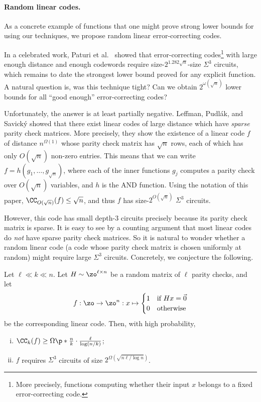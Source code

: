 \paragraph*{Random linear codes.} As a concrete example of functions that one might prove strong lower bounds for using our techniques, we propose random linear error-correcting codes.

In a celebrated work, Paturi et al.~\cite{PPSZ05} showed that error-correcting codes\footnote{More precisely, functions computing whether their input $x$ belongs to a fixed error-correcting code.} with large enough distance and enough codewords require size-$2^{1.282 \sqrt{n}}$-size $\Sigma^3$ circuits, which remains to date the strongest lower bound proved for any explicit function.
A natural question is, was this technique tight?
Can we obtain $2^{\omega(\sqrt{n})}$ lower bounds for all ``good enough'' error-correcting codes?

Unfortunately, the answer is at least partially negative.
Leffman, Pudlák, and Savický \cite{LPS97} showed that there exist linear codes of large distance which have \emph{sparse} parity check matrices.
More precisely, they show the existence of a linear code $f$ of distance $n^{\Omega(1)}$ whose parity check matrix has $\sqrt{n}$ rows, each of which has only $O(\sqrt{n})$ non-zero entries.
This means that we can write $f=h(g_1, \ldots, g_{\sqrt{n}})$, where each of the inner functions $g_j$ computes a parity check over $O(\sqrt{n})$ variables, and $h$ is the AND function.
Using the notation of this paper, $\CC_{O(\sqrt{n})}(f) \leq \sqrt{n}$, and thus $f$ has size-$2^{O(\sqrt{n})}$ $\Sigma^3$ circuits.

However, this code has small depth-3 circuits precisely because its parity check matrix is sparse.
It is easy to see by a counting argument that most linear codes do \emph{not} have sparse parity check matrices.
So it is natural to wonder whether a random linear code (a code whose parity check matrix is chosen uniformly at random) might require large $\Sigma^3$ circuits.
Concretely, we conjecture the following.

\begin{conjecture}
\label{conj:random-codes}
Let $\ell \ll k \ll n$. Let $H \sim \zo^{\ell \times n}$ be a random matrix of $\ell$ parity checks, and let
\[
f: \zo \to \zo^n : x \mapsto
\begin{cases}
1 & \text{if $Hx = \Vec{0}$}\\
0 & \text{otherwise}
\end{cases}
\]
be the corresponding linear code. Then, with high probability,
\begin{enumerate}[(i)]
    \item $\CC_k(f) \geq \Omega\p*{\frac{n}{k} \cdot \frac{\ell}{\log(n/k)}}$;
    \item $f$ requires $\Sigma^3$ circuits of size $2^{\Omega(\sqrt{n\ell / \log n})}$.
\end{enumerate}
\end{conjecture}

